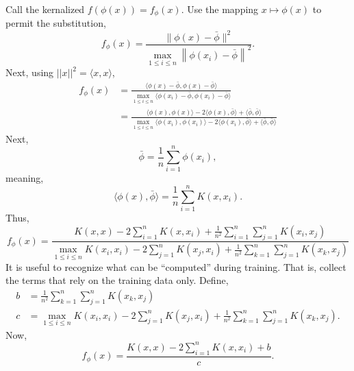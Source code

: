 \documentclass[12pt]{article}
\begin{document}
Call the kernalized $f(\phi(x)) = f_\phi(x)$. Use the mapping $x \mapsto \phi(x)$ to permit the substitution,
\begin{equation}
f_\phi(x)=\frac{\|\phi(x)-\bar{\phi}\|^{2}}{\max _{1 \leq i \leq n}\left\|\phi(x_{i})-\bar{\phi}\right\|^{2}}.
\end{equation}
Next, using $||x||^2 = \langle x, x \rangle$,
\begin{equation}
\begin{aligned}
f_\phi (x) &= \frac{\langle \phi(x) - \bar{\phi},   \phi(x) - \bar{\phi}\rangle}{ \max _{1 \leq i \leq n} \langle \phi(x_i) - \bar{\phi},   \phi(x_i) - \bar{\phi}\rangle} \\
&= \frac{\langle \phi(x), \phi(x) \rangle - 2 \langle \phi(x), \bar{\phi} \rangle + \langle \bar{\phi}, \bar{\phi} \rangle}{\max _{1 \leq i \leq n}  \langle \phi(x_i), \phi(x_i) \rangle - 2 \langle \phi(x_i), \bar{\phi} \rangle + \langle \bar{\phi}, \bar{\phi} \rangle}
\end{aligned}
\end{equation}
Next,
\begin{equation}
\bar{\phi} = \frac{1}{n} \sum_{i=1}^{n} \phi(x_i),
\end{equation}
meaning,
\begin{equation}
\langle \phi(x),  \bar{\phi} \rangle = \frac{1}{n} \sum_{i=1}^{n} K(x, x_i).
\end{equation}
Thus,
\begin{equation}
f_\phi(x) =\frac{K(x, x) - 2 \sum_{i=1}^{n} K(x, x_i) + \frac{1}{n^2} \sum_{i=1}^{n} \sum_{j=1}^{n} K(x_i, x_j)}{\max _{1 \leq i \leq n} K(x_i, x_i) - 2 \sum_{j=1}^{n} K(x_j, x_i) + \frac{1}{n^2} \sum_{k=1}^{n} \sum_{j=1}^{n} K(x_k, x_j)}
\end{equation}
It is useful to recognize what can be ``computed'' during training. That is, collect the terms that rely on the training data only. Define,
\begin{equation}
\begin{aligned}
b &=  \frac{1}{n^2} \sum_{k=1}^{n} \sum_{j=1}^{n} K(x_k, x_j) \\
c &= {\max _{1 \leq i \leq n} K(x_i, x_i) - 2 \sum_{j=1}^{n} K(x_j, x_i) + \frac{1}{n^2} \sum_{k=1}^{n} \sum_{j=1}^{n} K(x_k, x_j)}.
\end{aligned}
\end{equation}
Now,
\begin{equation}
f_\phi(x) =\frac{K(x, x) - 2 \sum_{i=1}^{n} K(x, x_i) + b}{c}.
\end{equation}
\end{document}
